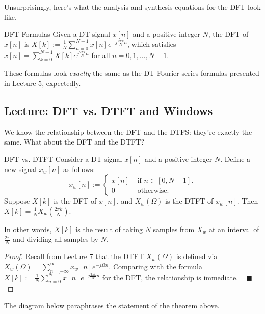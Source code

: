 Unsurprisingly, here's what the analysis and synthesis equations
for the DFT look like.

\begin{theorem}{DFT Formulas}
    Given a DT signal $x[n]$ and a positive integer $N$, the DFT of $x[n]$ is
    $X[k] := \frac{1}{N} \sum_{n = 0}^{N - 1} x[n] e^{-j \frac{2\pi k}{N} n}$,
    which satisfies
    $x[n] = \sum_{k = 0}^{N - 1} X[k] e^{j \frac{2\pi k}{N} n}$
    for all $n = 0, 1, \dots, N - 1$.
\end{theorem}

These formulas look \emph{exactly} the same as the DT Fourier series
formulas presented in \href{/6.300/lectures/5/#lecture-dt-fourier-series}{Lecture 5}, expectedly.

\subsection{Lecture: DFT vs. DTFT and Windows}

We know the relationship between the DFT and the DTFS:
they're exactly the same.  What about the DFT and the DTFT?

\begin{theorem}{DFT vs. DTFT}
    Consider a DT signal $x[n]$ and a positive integer $N$.
    Define a new signal $x_w[n]$ as follows:
    \[
        x_w[n] := \begin{cases}
        x[n] & \text{ if } n \in [0, N - 1]. \\
        0 & \text{ otherwise.}
        \end{cases}
    \]
    Suppose $X[k]$ is the DFT of $x[n]$,
    and $X_w(\Omega)$ is the DTFT of $x_w[n]$.  Then
    $X[k] = \frac{1}{N} X_w\left(\frac{2\pi k}{N}\right)$.

    In other words,
    $X[k]$ is the result of taking $N$ samples from $X_w$
    at an interval of $\frac{2\pi}{N}$
    and dividing all samples by $N$.
\end{theorem}

\begin{proof}
    Recall from
    \href{/6.300/lectures/7/#lecture-the-dt-fourier-transform}{Lecture 7}
    that the DTFT $X_w(\Omega)$ is defined via
    $X_w(\Omega) = \sum_{n = -\infty}^{\infty} x_w[n] e^{-j \Omega n}$.
    Comparing with the formula
    $X[k] := \frac{1}{N} \sum_{n = 0}^{N - 1} x[n] e^{-j \frac{2\pi k}{N} n}$
    for the DFT, the relationship is immediate. ~ $\blacksquare$
\end{proof}

The diagram below paraphrases the statement of the theorem above.

